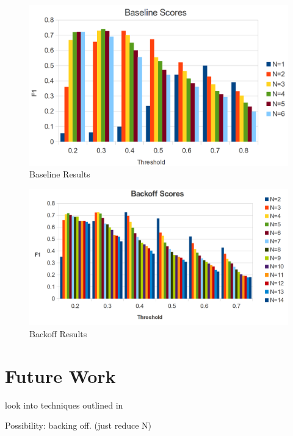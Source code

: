 \documentclass{article}
\begin{document}
\begin{figure}
\begin{center}
\includegraphics[scale=0.17]{baselinescores.png}
\end{center}
\caption{Baseline Results}
\label{baseline}
\end{figure}


\begin{figure}
\begin{center}
\includegraphics[scale=0.17]{backoff.png}
\end{center}
\caption{Backoff Results}
\label{backoff}
\end{figure}


\section{Future Work}
look into techniques outlined in \cite{ngram_sim}








Possibility: backing off. (just reduce N)
\end{document}
